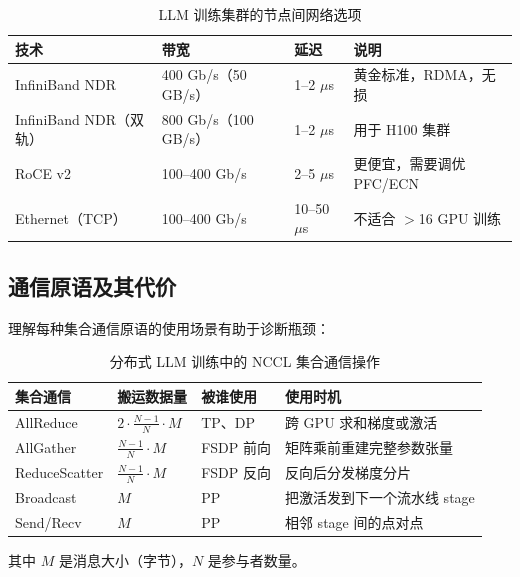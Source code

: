 \begin{table}[ht!]
\centering
\caption{LLM 训练集群的节点间网络选项}
{\small
\noindent\begin{tabularx}{\linewidth}{@{}Z{0.95} Z{0.93} l Z{1.12}@{}}
\toprule
\textbf{技术} & \textbf{带宽} & \textbf{延迟} & \textbf{说明} \\
\midrule
InfiniBand NDR & 400 Gb/s（50 GB/s） & 1--2 $\mu$s & 黄金标准，RDMA，无损 \\
InfiniBand NDR（双轨） & 800 Gb/s（100 GB/s） & 1--2 $\mu$s & 用于 H100 集群 \\
RoCE v2 & 100--400 Gb/s & 2--5 $\mu$s & 更便宜，需要调优 PFC/ECN \\
Ethernet（TCP） & 100--400 Gb/s & 10--50 $\mu$s & 不适合 $>$16 GPU 训练 \\
\bottomrule
\end{tabularx}
}
\end{table}

\subsection{通信原语及其代价}
\label{communication-primitives-and-their-costs}

理解每种集合通信原语的使用场景有助于诊断瓶颈：

\begin{table}[ht!]
\centering\small
\caption{分布式 LLM 训练中的 NCCL 集合通信操作}
\begin{tabularx}{0.88\linewidth}{@{}l Z{0.48} Z{0.46} Z{2.06}@{}}
\toprule
\textbf{集合通信} & \textbf{搬运数据量} & \textbf{被谁使用} & \textbf{使用时机} \\
\midrule
AllReduce & $2 \cdot \frac{N-1}{N} \cdot M$ & TP、DP & 跨 GPU 求和梯度或激活 \\
AllGather & $\frac{N-1}{N} \cdot M$ & FSDP 前向 & 矩阵乘前重建完整参数张量 \\
ReduceScatter & $\frac{N-1}{N} \cdot M$ & FSDP 反向 & 反向后分发梯度分片 \\
Broadcast & $M$ & PP & 把激活发到下一个流水线 stage \\
Send/Recv & $M$ & PP & 相邻 stage 间的点对点 \\
\bottomrule
\end{tabularx}
\end{table}

其中 $M$ 是消息大小（字节），$N$ 是参与者数量。

